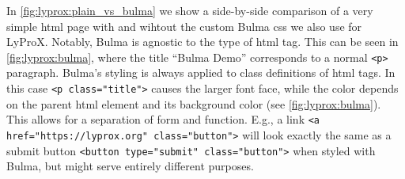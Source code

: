 \documentclass[\relativeRoot/main.tex]{subfiles}
\begin{document}
In \cref{fig:lyprox:plain_vs_bulma} we show a side-by-side comparison of a very simple \acrshort{html} page with and wihtout the custom Bulma \gls{css} we also use for LyProX. Notably, Bulma is agnostic to the type of \acrshort{html} tag. This can be seen in \cref{fig:lyprox:bulma}, where the title ``Bulma Demo'' corresponds to a normal \texttt{<p>} paragraph. Bulma's styling is always applied to class definitions of \acrshort{html} tags. In this case \texttt{<p class="title">} causes the larger font face, while the color depends on the parent \acrshort{html} element and its background color (see \cref{fig:lyprox:bulma}). This allows for a separation of form and function. E.g., a link \texttt{<a href="https://lyprox.org" class="button">} will look exactly the same as a submit button \texttt{<button type="submit" class="button">} when styled with Bulma, but might serve entirely different purposes.
\end{document}
